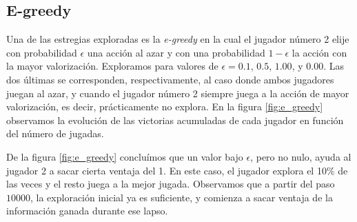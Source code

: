 \documentclass[11pt, spanish]{article}
\begin{document}
\subsection{E-greedy}
\par Una de las estregias exploradas es la \emph{e-greedy} en la cual el 
jugador número 2 elije con probabilidad $\epsilon$ una acción al azar y con 
una probabilidad $1-\epsilon$ la acción con la mayor valorización. Exploramos 
para valores de $\epsilon = 0.1$, $0.5$, $1.00$, y $0.00$. Las dos últimas se 
corresponden, respectivamente, al caso donde ambos jugadores juegan al azar, y 
cuando el jugador número 2 siempre juega a la acción de mayor valorización, es 
decir, prácticamente no explora. En la figura \ref{fig:e_greedy} observamos la 
evolución de las victorias acumuladas de cada jugador en función del número de 
jugadas.
\par De la figura \ref{fig:e_greedy} concluímos que un valor bajo $\epsilon$, pero no nulo, ayuda al jugador 2 a sacar cierta ventaja del 1. En este caso, el jugador explora el 10\% de las veces y el resto juega a la mejor jugada. Observamos que a partir del paso $10000$, la exploración inicial ya es suficiente, y comienza a sacar ventaja de la información ganada durante ese lapso. 
\end{document}
